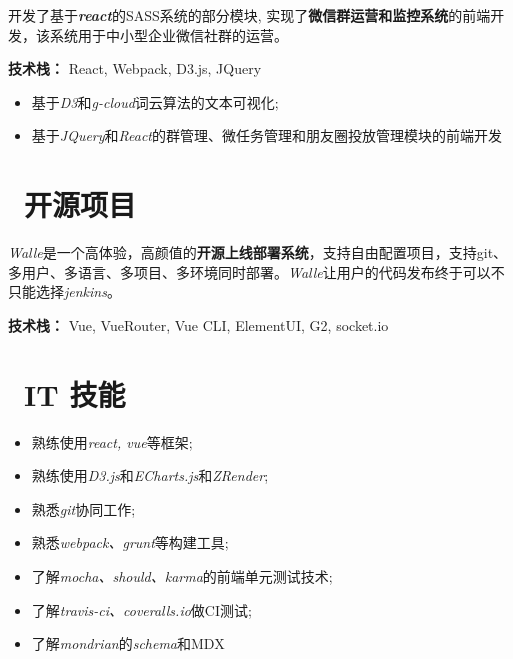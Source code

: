 \documentclass{resume}
\begin{document}
\begin{onehalfspacing}
开发了基于\textit{\textbf{react}}的SASS系统的部分模块, 实现了\textbf{微信群运营和监控系统}的前端开发，该系统用于中小型企业微信社群的运营。


\textbf{技术栈：} React, Webpack, D3.js, JQuery
\begin{itemize}
  \item 基于\textit{D3}和\textit{g-cloud}词云算法的文本可视化;
  \item 基于\textit{JQuery}和\textit{React}的群管理、微任务管理和朋友圈投放管理模块的前端开发
\end{itemize}
\end{onehalfspacing}


\section{\faUsers\ 开源项目}

\begin{onehalfspacing}
\textit{Walle}是一个高体验，高颜值的\textbf{开源上线部署系统}，支持自由配置项目，支持git、多用户、多语言、多项目、多环境同时部署。\textit{Walle}让用户的代码发布终于可以不只能选择\textit{jenkins}。


\textbf{技术栈：} Vue, VueRouter, Vue CLI, ElementUI, G2, socket.io
\end{onehalfspacing}

\section{\faCogs\ IT 技能}
\begin{itemize}[parsep=0.5ex]
  \item 熟练使用\textit{react, vue}等框架;
  \item 熟练使用\textit{D3.js}和\textit{ECharts.js}和\textit{ZRender};
  \item 熟悉\textit{git}协同工作;
  \item 熟悉\textit{webpack、grunt}等构建工具;
  \item 了解\textit{mocha、should、karma}的前端单元测试技术;
  \item 了解\textit{travis-ci、coveralls.io}做CI测试;
  \item 了解\textit{mondrian}的\textit{schema}和MDX
\end{itemize}
\end{document}
